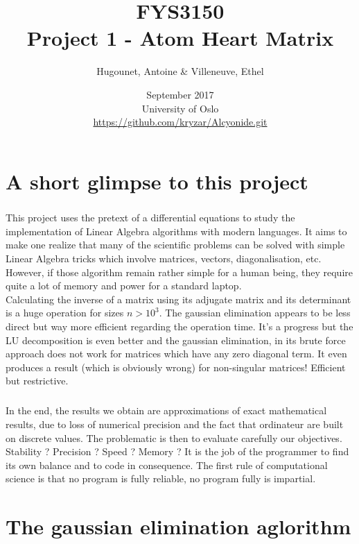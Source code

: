 \documentclass[a4paper, twoside, 11pt]{report}
\title{FYS3150\\Project 1 - Atom Heart Matrix}
\author{Hugounet, Antoine \& Villeneuve, Ethel}
\date{September 2017 \\University of Oslo \\ \url{https://github.com/kryzar/Alcyonide.git}}
\theoremstyle{theorem}
\theoremstyle{remark}
\theoremstyle{exemple}
\begin{document}
\maketitle

\renewcommand{\contentsname}{Table of contents}
\tableofcontents
	

\chapter*{A short glimpse to this project}	
	
\paragraph{}This project uses the pretext of a differential equations to study the implementation of Linear Algebra algorithms with modern languages. It aims to make one realize that many of the scientific problems can be solved with simple Linear Algebra tricks which involve matrices, vectors, diagonalisation, etc. However, if those algorithm remain rather simple for a human being, they require quite a lot of memory and power for a standard laptop.
	\\Calculating the inverse of a matrix using its adjugate matrix and its determinant is a huge operation for sizes $n>{10}^{3}$. The gaussian elimination appears to be less direct but way more efficient regarding the operation time. It's a progress but the LU decomposition is even better and the gaussian elimination, in its brute force approach does not work for matrices which have any zero diagonal term. It even produces a result (which is obviously wrong) for non-singular matrices! Efficient but restrictive.

\paragraph{}In the end, the results we obtain are approximations of exact mathematical results, due to loss of numerical precision and the fact that ordinateur are built on discrete values. The problematic is then to evaluate carefully our objectives. Stability ? Precision ? Speed ? Memory ? It is the job of the programmer to find its own balance and to code in consequence. The first rule of computational science is that no program is fully reliable, no program fully is impartial.
	
	
\chapter{The gaussian elimination aglorithm}
\end{document}
